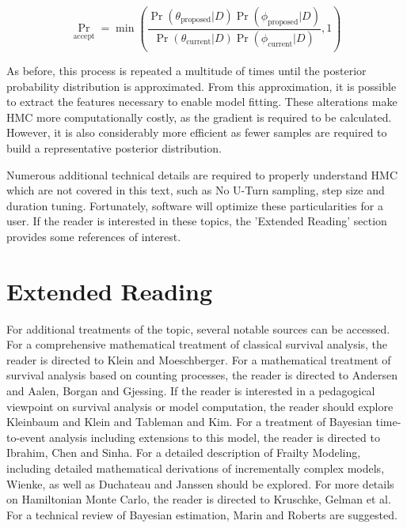 $$ \Pr_{\text{accept}} = \min\left (\frac{\Pr(\theta_{\text{proposed}}|D)\Pr(\phi_{\text{proposed}}|D)}{\Pr(\theta_{\text{current}}|D)\Pr(\phi_{\text{current}}|D)} , 1 \right )$$

As before, this process is repeated a multitude of times until the posterior probability distribution is approximated. From this approximation, it is possible to extract the features necessary to enable model fitting. These alterations make HMC more computationally costly, as the gradient is required to be calculated. However, it is also considerably more efficient as fewer samples are required to build a representative posterior distribution.


Numerous additional technical details are required to properly understand HMC which are not covered in this text, such as No U-Turn sampling, step size and duration tuning. Fortunately, software will optimize these particularities for a user. If the reader is interested in these topics, the 'Extended Reading' section provides some references of interest.



\section*{Extended Reading}

For additional treatments of the topic, several notable sources can be accessed. For a comprehensive mathematical treatment of classical survival analysis, the reader is directed to Klein and Moeschberger\cite{Klein2003}. For a mathematical treatment of survival analysis based on counting processes, the reader is directed to Andersen\cite{Andersen1992} and Aalen, Borgan and Gjessing\cite{Aalen2008}. If the reader is interested in a pedagogical viewpoint on survival analysis or model computation, the reader should explore Kleinbaum and Klein\cite{Kleinbaum2005} and Tableman and Kim\cite{Tableman2004}. For a treatment of Bayesian time-to-event analysis including extensions to this model, the reader is directed to Ibrahim, Chen and Sinha\cite{Ibrahim2005}. For a detailed description of Frailty Modeling, including detailed mathematical derivations of incrementally complex models, Wienke\cite{Wienke2010}, as well as Duchateau and Janssen\cite{Duchateau2008} should be explored. For more details on Hamiltonian Monte Carlo, the reader is directed to Kruschke\cite{Kruschke2015}, Gelman et al\cite{Gelman2014}. For a technical review of Bayesian estimation, Marin and Roberts\cite{Marin2007} are suggested.


